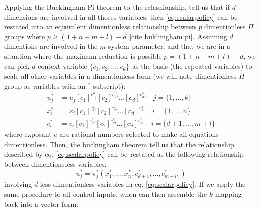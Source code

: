 Applying the Buckingham Pi theorem to the relashionship, tell us that if $d$ dimensions are involved in all thoses variables, then \ref{eq:scalarpolicy} can be restated into an equivalent dimentionless relationship between $p$ dimentionless $\Pi$ groups where $p \geq (1 + n + m + l ) - d$ [cite bukhingham pi]. Assuming $d$ dimentions are involved in the $m$ system parameter, and that we are in a situation where the maximum reduction is possible $p = (1 + n + m + l ) - d$, we can pick $d$ context variable $\{c_1, c_2 , \hdots,c_d\}$ as the basis (the repeated variables) to scale all other variables in a dimentionless form (we will note dimentionless $\Pi$ group as variables with an ${}^*$ subscript):
\begin{align}
u_j^* &= u_j \left[ c_1 \right]^{e^u_{1j}} \left[ c_2 \right]^{e^u_{2j}} \hdots \left[ c_d \right]^{e^u_{dj}} \quad \scriptstyle j = \{ 1, \hdots , k \} \label{eq:piu}\\
x_i^* &= x_i \left[ c_1 \right]^{e^x_{1i}} \left[ c_2 \right]^{e^x_{2i}} \hdots \left[ c_d \right]^{e^x_{di}} \quad \scriptstyle i = \{ 1, \hdots , n \} \label{eq:pix}\\
c_i^* &= c_i\left[ c_1 \right]^{e^c_{1i}} \left[ c_2 \right]^{e^c_{2i}} \hdots \left[ c_d \right]^{e^c_{di}} \quad \scriptstyle i = \{ d+1, \hdots , m+l \} \label{eq:pic}%
\end{align}
where exposant $e$ are rational numbers selected to make all equations dimentionless. Then, the buckingham theorem tell us that the relationship described by eq. \eqref{eq:scalarpolicy} can be restated as the following relationship between  dimentionsless variables:
\begin{equation}
u_j^* = \pi_j^* \left(
x_1^*, \hdots, x_n^*, 
c_{d+1}^*, \hdots, c_{m+l}^*, 
\right) 
\label{eq:scalardimpolicy}
\end{equation}
involving $d$ less dimentionless variables in eq. \eqref{eq:scalarpolicy}. If we apply the same procedure to all control inputs, when can then assemble the $k$ mapping back into a vector form:
